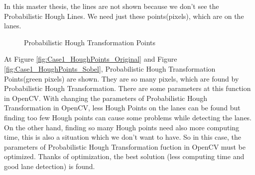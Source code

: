 In this master thesis, the lines are not shown because we don't see the Probabilistic Hough Lines. We need just these points(pixels), which are on the lanes. 

\begin{figure}[H]
  \centering
  \hfill
  \caption{Probabilistic Hough Transformation Points}
\end{figure} 
 
At Figure \ref{fig:Case1_HoughPoints_Original} and Figure \ref{fig:Case1_HoughPoints_Sobel}, Probabilistic Hough Transformation Points(green pixels) are shown. They are so many pixels, which are found by Probabilistic Hough Transformation. There are some parameters at this function in OpenCV.  With changing the parameters of Probabilistic Hough Transformation in OpenCV, less Hough Points on the lanes can be found but finding too few Hough points can cause some problems while detecting the lanes. On the other hand, finding so many Hough points need also more computing time, this is also a situation which we don't want to have. So in this case, the parameters of Probabilistic Hough Transformation fuction in OpenCV must be optimized. Thanks of optimization, the best solution (less computing time and good lane detection) is found.

